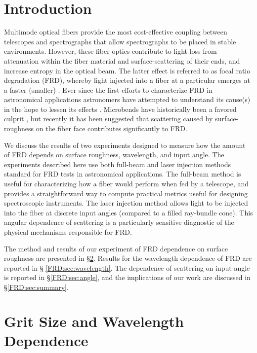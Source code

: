 \section{Introduction}

Multimode optical fibers provide the most cost-effective coupling
between telescopes and spectrographs that allow spectrographs to be
placed in stable environments. However, these fiber optics contribute
to light loss from attenuation within the fiber material and
surface-scattering of their ends, and increase entropy in the optical
beam. The latter effect is referred to as focal ratio degradation
(FRD), whereby light injected into a fiber at a particular \fratio
emerges at a faster (smaller) \fratio. Ever since the first efforts to
characterize FRD in astronomical applications \citep{Angel77}
astronomers have attempted to understand its cause(s) in the hope to
lessen its effects \citep{Carrasco,Oliveira}. Microbends have
historically been a favored culprit \citep{Carrasco,Gloge72}, but
recently it has been suggested \citep{Haynes11, Avila98} that scattering
caused by surface-roughness on the fiber face contributes
significantly to FRD.

We discuss the results of two experiments designed to measure how the
amount of FRD depends on surface roughness, wavelength, and input
angle. The experiments described here use both full-beam and laser
injection methods \citep{Carrasco} standard for FRD tests in
astronomical applications. The full-beam method is useful for
characterizing how a fiber would perform when fed by a telescope,
and provides a straightforward way to compute practical metrics useful
for designing spectroscopic instruments. The laser injection method
allows light to be injected into the fiber at discrete input angles
(compared to a filled ray-bundle cone). This angular dependence of
scattering is a particularly sensitive diagnostic of the physical
mechanisms responsible for FRD.

The method and results of our experiment of FRD dependence on surface
roughness are presented in \S \ref{FRD:sec:polish}. Results for the
wavelength dependence of FRD are reported in \S
\ref{FRD:sec:wavelength}. The dependence of scattering on input angle is
reported in \S \ref{FRD:sec:angle}, and the implications of our work are
discussed in \S \ref{FRD:sec:summary}.

\section{Grit Size and Wavelength Dependence}
\label{FRD:sec:polish}
